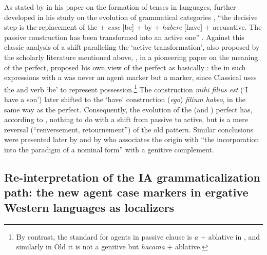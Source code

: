 \documentclass[output=paper]{langsci/langscibook}
\begin{document}
As stated by \citet{Kuryłowicz1931} in his paper on the formation of tenses in  languages, further developed in his study on the evolution of grammatical categories \citep{Kuryłowicz1965}, “the decisive step is the replacement of the  + \textit{esse} [be] +  by  + \textit{habere} [have] + accusative. The passive construction has been transformed into an active one” \citep[107]{Kuryłowicz1931}. 
  Against this classic analysis of a  shift paralleling the `active transformation’, also proposed by the  scholarly literature mentioned above, \citet{Benveniste1952}, in a pioneering paper on the meaning of the perfect, proposed his own view of the perfect as basically : the   in such  expressions with a  was never an agent marker but a  marker, since Classical  uses the  and verb ‘be’ to represent possession.\footnote{By contrast, the standard  for agents in passive clause is \textit{a} + ablative in , and similarly in Old  it is not a genitive but \textit{hacama} + ablative.}  The  construction \textit{mihi filius est} (‘I have a son’) later shifted to the ‘have’ construction (\textit{ego}) \textit{filium habeo}, in the same way as the perfect. 
Consequently, the evolution of the  (and ) perfect has, according to \citet{Benveniste1952}, nothing to do with a shift from passive to active, but is a mere reversal (“renversement, retournement”) of the old  pattern. Similar conclusions were presented later by \citet{Pirejko1979} and by \citet[397]{Trask1979} who associates the  origin with “the incorporation into the  paradigm of a nominal form” with a genitive  complement. 

\subsection{Re-interpretation of the IA grammaticalization path: the new agent case markers in ergative Western languages as localizers}\label{sec:montaut:2.3}
\end{document}
